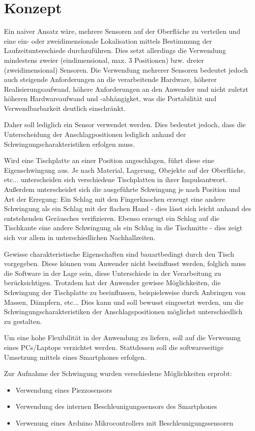 \section{Konzept}
Ein naiver Ansatz wäre, mehrere Sensoren auf der Oberfläche zu verteilen und eine ein- oder zweidimensionale Lokalisation mittels Bestimmung der Laufzeitunterschiede durchzuführen.
Dies setzt allerdings die Verwendung mindestens zweier (eindimensional, max. 3 Positionen) bzw. dreier (zweidimensional) Sensoren. 
Die Verwendung mehrerer Sensoren bedeutet jedoch auch steigende Anforderungen an die verarbeitende Hardware, höherer Realisierungsaufwand, höhere Anforderungen an den Anwender und nicht zuletzt höheren Hardwareaufwand und -abhängigket, was die Portabilität und Verwendbarbarkeit deutlich einschränkt.

Daher soll lediglich ein Sensor verwendet werden. Dies bedeutet jedoch, dass die Unterscheidung der Anschlagpositionen lediglich anhand der Schwingungscharakteristiken erfolgen muss.

Wird eine Tischplatte an einer Position angeschlagen, führt diese eine Eigenschwingung aus.
Je nach Material, Lagerung, Obejekte auf der Oberfläche, etc... unterscheiden sich verschiedene Tischplatten in ihrer Impulsantwort.
Außerdem unterscheidet sich die ausgeführte Schwingung je nach Position und Art der Erregung: 
Ein Schlag mit den Fingerknochen erzeugt eine andere Schwingung als ein Schlag mit der flachen Hand - dies lässt sich leicht anhand des entstehenden Geräusches verifizieren.
Ebenso erzeugt ein Schlag auf die Tischkante eine andere Schwingung als ein Schlag in die Tischmitte - dies zeigt sich vor allem in unterschiedlichen Nachhallzeiten.

Gewisse charakteristische Eigenschaften sind bauartbedingt durch den Tisch vorgegeben. 
Diese können vom Anwender nicht beeinflusst werden, folglich muss die Software in der Lage sein, diese Unterschiede in der Verarbeitung zu berücksichtigen. 
Trotzdem hat der Anwender gewisse Möglichkeiten, die Schwingung der Tischplatte zu beeinflussen, beispielsweise durch Anbringen von Massen, Dämpfern, etc... 
Dies kann und soll bewusst eingesetzt werden, um die Schwingungscharakteristiken der Anschlagspositionen möglichst unterschiedlich zu gestalten.  

Um eine hohe Flexibilität in der Anwendung zu liefern, soll auf die Verwenung eines PCs/Laptops verzichtet werden. Stattdessen soll die softwareseitige Umsetzung mittels eines Smartphones erfolgen.

Zur Aufnahme der Schwingung wurden verschiedene Möglichkeiten erprobt:
\begin{itemize}
	\item Verwendung eines Piezzosensors
	\item Verwendung des internen Beschleunigungssensors des Smartphones
	\item Verwenung eines Arduino Mikrocontrollers mit Beschleunigungssensoren  
\end{itemize}

